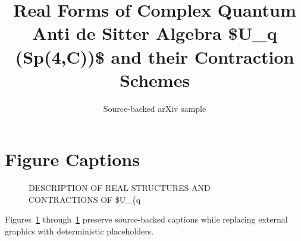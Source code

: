 \documentclass[11pt]{article}
\title{Real Forms of Complex Quantum Anti de Sitter Algebra \$U\_q (Sp(4,C))\$ and
  their Contraction Schemes}
\author{Source-backed arXiv sample}
\date{}
\begin{document}
\maketitle
\section{Figure Captions}

\begin{figure}[htbp]
\centering
\fbox{\rule{0pt}{1.15in}\rule{0.78\linewidth}{0pt}}
\caption{DESCRIPTION OF REAL STRUCTURES AND CONTRACTIONS OF \$U\_\{q}
\label{fig:source-1}
\end{figure}


Figures~\ref{fig:source-1} through~\ref{fig:source-1} preserve source-backed captions while replacing external graphics with deterministic placeholders.
\end{document}

